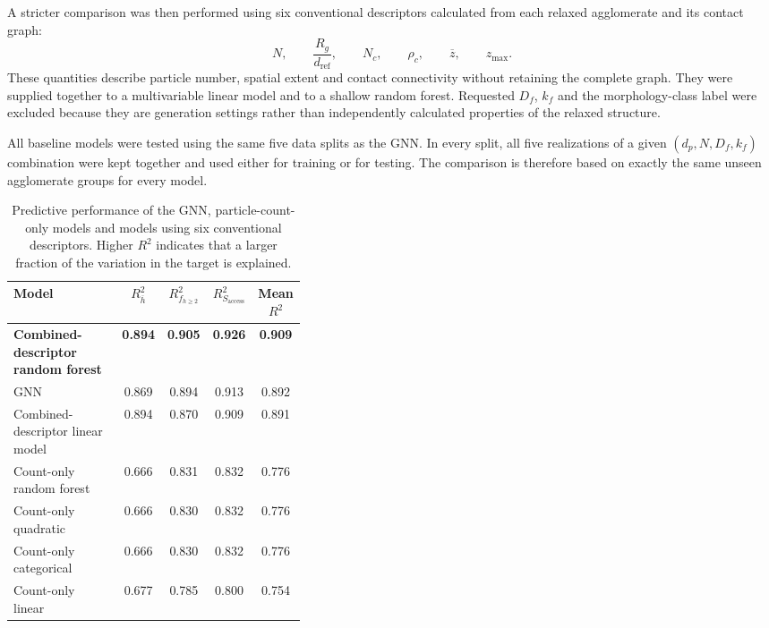\documentclass[12pt,a4paper]{article}
\begin{document}
A stricter comparison was then performed using six conventional descriptors
calculated from each relaxed agglomerate and its contact graph:
\begin{equation}
	N,\qquad \frac{R_g}{d_{\mathrm{ref}}},\qquad N_c,\qquad
	\rho_c,\qquad \overline z,\qquad z_{\max}.
\end{equation}
These quantities describe particle number, spatial extent and contact
connectivity without retaining the complete graph. They were supplied together
to a multivariable linear model and to a shallow random forest. Requested
$D_f$, $k_f$ and the morphology-class label were excluded because they are
generation settings rather than independently calculated properties of the
relaxed structure.

All baseline models were tested using the same five data splits as the GNN. In
every split, all five realizations of a given $(d_p,N,D_f,k_f)$ combination were
kept together and used either for training or for testing. The comparison is
therefore based on exactly the same unseen agglomerate groups for every model.

\begin{table}[!tbp]
	\centering
	\caption{Predictive performance of the GNN, particle-count-only models and
		models using six conventional descriptors. Higher $R^2$ indicates that a
		larger fraction of the variation in the target is explained.}
	\label{tab:particle_count_baseline}
	\begin{tabular}{P{0.38\linewidth}cccc}
		\toprule
		\textbf{Model} &
		$R^2_{\overline{h}}$ &
		$R^2_{f_{h\geq2}}$ &
		$R^2_{S_{\mathrm{access}}}$ &
		\textbf{Mean $R^2$} \\
		\midrule
		\textbf{Combined-descriptor random forest}
		& \textbf{0.894} & \textbf{0.905} & \textbf{0.926} & \textbf{0.909} \\
		GNN & 0.869 & 0.894 & 0.913 & 0.892 \\
		Combined-descriptor linear model & 0.894 & 0.870 & 0.909 & 0.891 \\
		\midrule
		Count-only random forest & 0.666 & 0.831 & 0.832 & 0.776 \\
		Count-only quadratic     & 0.666 & 0.830 & 0.832 & 0.776 \\
		Count-only categorical   & 0.666 & 0.830 & 0.832 & 0.776 \\
		Count-only linear        & 0.677 & 0.785 & 0.800 & 0.754 \\
		\bottomrule
	\end{tabular}
\end{table}
\end{document}
